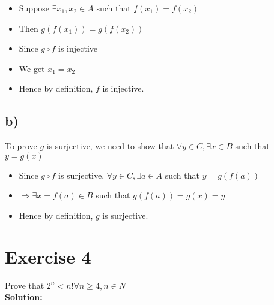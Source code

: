 \documentclass{article}
\begin{document}
\begin{itemize}
    \item Suppose $\exists x_1, x_2 \in A$ such that $f(x_1) = f(x_2)$
    \item Then $g(f(x_1)) = g(f(x_2))$
    \item Since $g \circ f$ is injective
    \item We get $x_1 = x_2$
    \item Hence by definition, $f$ is injective.
\end{itemize}    

\subsection*{b)}

To prove $g$ is surjective, we need to show that $\forall y \in C, \exists x \in B$ such that $y = g(x)$

\begin{itemize}
    \item Since $g \circ f$ is surjective, $\forall y \in C, \exists a \in A$ such that $y = g(f(a))$
    \item $\Rightarrow \exists x = f(a) \in B$ such that $g(f(a)) = g(x) = y$
    \item Hence by definition, $g$ is surjective.
\end{itemize}

\newpage

\section*{Exercise 4}

Prove that $2^n < n! \forall n \geq 4, n \in N$ \\

\textbf{Solution:}
\end{document}

